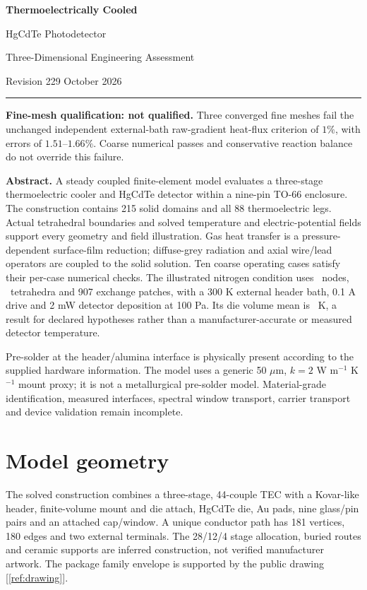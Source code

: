 \documentclass[11pt,a4paper]{article}
\begin{document}
\thispagestyle{empty}
{\LARGE\bfseries Thermoelectrically Cooled\par\vspace{2mm}HgCdTe Photodetector\par}
\vspace{3mm}
{\Large Three-Dimensional Engineering Assessment\par}
\vspace{5mm}
Revision 2\hfill 29 October 2026
\par\rule{\linewidth}{.5pt}
\textbf{Fine-mesh qualification: not qualified.}
Three converged fine meshes fail the unchanged independent external-bath
raw-gradient heat-flux criterion of $1\%$, with errors of $1.51$--$1.66\%$.
Coarse numerical passes and conservative reaction balance do not override this failure.

\textbf{Abstract.}
A steady coupled finite-element model evaluates a three-stage thermoelectric
cooler and HgCdTe detector within a nine-pin TO-66 enclosure. The construction
contains 215 solid domains and all 88 thermoelectric legs. Actual tetrahedral
boundaries and solved temperature and electric-potential fields support every
geometry and field illustration. Gas heat transfer is a pressure-dependent
surface-film reduction; diffuse-grey radiation and axial wire/lead operators
are coupled to the solid solution. Ten coarse operating cases satisfy their
per-case numerical checks. The illustrated nitrogen condition uses
\NodeCount\ nodes, \TetCount\ tetrahedra and 907 exchange patches, with a
300 K external header bath, 0.1 A drive and 2 mW detector deposition at 100 Pa.
Its die volume mean is \FieldDie\ K, a result for declared hypotheses rather
than a manufacturer-accurate or measured detector temperature.

Pre-solder at the header/alumina interface is physically present according to
the supplied hardware information. The model uses a generic 50 $\mu$m,
$k=2$ W m$^{-1}$ K$^{-1}$ mount proxy; it is not a metallurgical pre-solder model.
Material-grade identification, measured interfaces, spectral window transport,
carrier transport and device validation remain incomplete.

\vspace{2mm}
{\small\setlength{\parskip}{0pt}\tableofcontents}
\clearpage
\section{Model geometry}
The solved construction combines a three-stage, 44-couple TEC with a Kovar-like
header, finite-volume mount and die attach, HgCdTe die, Au pads, nine glass/pin
pairs and an attached cap/window. A unique conductor path has 181 vertices,
180 edges and two external terminals. The 28/12/4 stage allocation, buried
routes and ceramic supports are inferred construction, not verified manufacturer
artwork. The package family envelope is supported by the public drawing [\ref{ref:drawing}].
\end{document}
